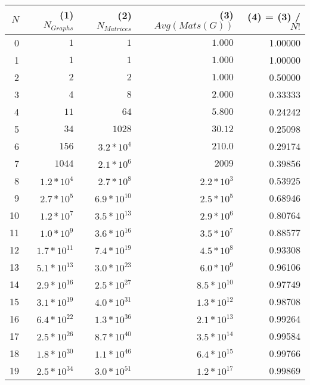 \documentclass[a4paper,12pt]{article}
\begin{document}
\begin{tabular}{ r | r | r || r ||| r}
  \(N\) & (1) \(N_{Graphs}\) & (2) \(N_{Matrices}\) & (3) \(Avg(Mats(G))\) & (4) = (3) / \(N!\) \\
  \hline			
  0 & \(1\) & \(1\) & \(1.000\) & 1.00000 \\
  1 & \(1\) & \(1\) & \(1.000\) & 1.00000 \\
  2 & \(2\) & \(2\) & \(1.000\) & 0.50000 \\
  3 & \(4\) & \(8\) & \(2.000\) & 0.33333 \\
  4 & \(11\) & \(64\) & \(5.800\) & 0.24242 \\
  5 & \(34\) & \(1028\) & \(30.12\) & 0.25098 \\
  6 & \(156\) & \(3.2 * 10^4\) & \(210.0\) & 0.29174 \\
  7 & \(1044\) & \(2.1 * 10^6\) & \(2009\) & 0.39856 \\
  8 & \(1.2 * 10^{4}\) & \(2.7 * 10^{8}\) & \(2.2 * 10^{3}\) & 0.53925 \\
  9 & \(2.7 * 10^{5}\) & \(6.9 * 10^{10}\) & \(2.5 * 10^{5}\) & 0.68946 \\
  10 & \(1.2 * 10^{7}\) & \(3.5 * 10^{13}\) & \(2.9 * 10^{6}\) & 0.80764 \\
  11 & \(1.0 * 10^{9}\) & \(3.6 * 10^{16}\) & \(3.5 * 10^{7}\) & 0.88577 \\
  12 & \(1.7 * 10^{11}\) & \(7.4 * 10^{19}\) & \(4.5 * 10^{8}\) & 0.93308 \\
  13 & \(5.1 * 10^{13}\) & \(3.0 * 10^{23}\) & \(6.0 * 10^{9}\) & 0.96106 \\
  14 & \(2.9 * 10^{16}\) & \(2.5 * 10^{27}\) & \(8.5 * 10^{10}\) & 0.97749 \\
  15 & \(3.1 *10^{19}\) & \(4.0 * 10^{31}\) & \(1.3 * 10^{12}\) & 0.98708 \\
  16 & \(6.4 * 10^{22}\) & \(1.3 * 10^{36}\) & \(2.1 * 10^{13}\) & 0.99264 \\
  17 & \(2.5 * 10^{26}\) & \(8.7 * 10^{40}\) & \(3.5 * 10^{14}\) & 0.99584 \\
  18 & \(1.8 * 10^{30}\) & \(1.1 * 10^{46}\) & \(6.4 * 10^{15}\) & 0.99766 \\
  19 & \(2.5 * 10^{34}\) & \(3.0 * 10^{51}\) & \(1.2 * 10^{17}\) & 0.99869 \\
  \hline  
\end{tabular}
\end{document}
